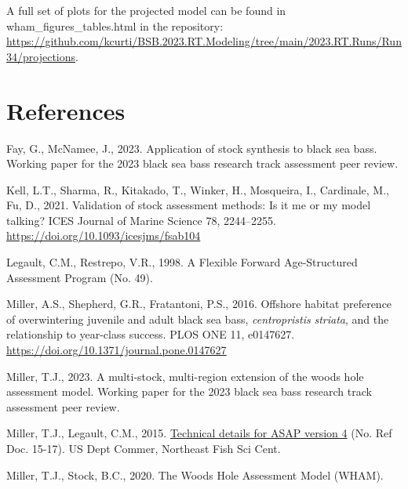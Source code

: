 \documentclass[
]{article}
\newlength{\cslhangindent}
\newlength{\cslentryspacingunit} %
\newenvironment{CSLReferences}[2] %
 {%
  \setlength{\parindent}{0pt}
  \ifodd #1
  \let\oldpar\par
  \def\par{\hangindent=\cslhangindent\oldpar}
  \fi
  \setlength{\parskip}{#2\cslentryspacingunit}
 }%
 {}
\begin{document}
A full set of plots for the projected model can be found in wham\_figures\_tables.html in the repository: \url{https://github.com/kcurti/BSB.2023.RT.Modeling/tree/main/2023.RT.Runs/Run34/projections}.

\hypertarget{references}{%
\section*{References}\label{references}}

\hypertarget{refs}{}
\begin{CSLReferences}{1}{0}
\leavevmode{}%
Fay, G., McNamee, J., 2023. Application of stock synthesis to black sea bass. Working paper for the 2023 black sea bass research track assessment peer review.

\leavevmode{}%
Kell, L.T., Sharma, R., Kitakado, T., Winker, H., Mosqueira, I., Cardinale, M., Fu, D., 2021. Validation of stock assessment methods: Is it me or my model talking? ICES Journal of Marine Science 78, 2244--2255. \url{https://doi.org/10.1093/icesjms/fsab104}

\leavevmode{}%
Legault, C.M., Restrepo, V.R., 1998. A {Flexible Forward Age}-{Structured Assessment Program} (No. 49).

\leavevmode{}%
Miller, A.S., Shepherd, G.R., Fratantoni, P.S., 2016. Offshore habitat preference of overwintering juvenile and adult black sea bass, \emph{centropristis} \emph{striata}, and the relationship to year-class success. {PLOS} {ONE} 11, e0147627. \url{https://doi.org/10.1371/journal.pone.0147627}

\leavevmode{}%
Miller, T.J., 2023. A multi-stock, multi-region extension of the woods hole assessment model. Working paper for the 2023 black sea bass research track assessment peer review.

\leavevmode{}%
Miller, T.J., Legault, C.M., 2015. \href{https://doi:10.7289/V57W695G}{Technical details for {ASAP} version 4} (No. Ref Doc. 15-17). {US Dept Commer, Northeast Fish Sci Cent}.

\leavevmode{}%
Miller, T.J., Stock, B.C., 2020. The {Woods Hole Assessment Model} ({WHAM}).


\end{CSLReferences}
\end{document}
